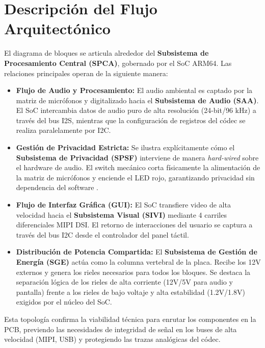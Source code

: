 \documentclass[%
	paper=a4,
	twoside=false,
	parskip=half,
	chapterprefix=false,
	10pt,
	headings=normal,
	bibliography=totoc,
	listof=totoc,
	titlepage=on,
	captions=tableabove,
	draft=false,
]{scrbook}%
\begin{document}
\section{Descripción del Flujo Arquitectónico}

El diagrama de bloques se articula alrededor del \textbf{Subsistema de Procesamiento Central (SPCA)}, gobernado por el SoC ARM64. Las relaciones principales operan de la siguiente manera:

\begin{itemize}
    \item \textbf{Flujo de Audio y Procesamiento:} El audio ambiental es captado por la matriz de micrófonos y digitalizado hacia el \textbf{Subsistema de Audio (SAA)}. El SoC intercambia datos de audio puro de alta resolución (24-bit/96 kHz) a través del bus I2S, mientras que la configuración de registros del códec se realiza paralelamente por I2C.
    \item \textbf{Gestión de Privacidad Estricta:} Se ilustra explícitamente cómo el \textbf{Subsistema de Privacidad (SPSF)} interviene de manera \textit{hard-wired} sobre el hardware de audio. El switch mecánico corta físicamente la alimentación de la matriz de micrófonos y enciende el LED rojo, garantizando privacidad sin dependencia del software \cite{guia_proyecto_final}.
    \item \textbf{Flujo de Interfaz Gráfica (GUI):} El SoC transfiere video de alta velocidad hacia el \textbf{Subsistema Visual (SIVI)} mediante 4 carriles diferenciales MIPI DSI. El retorno de interacciones del usuario se captura a través del bus I2C desde el controlador del panel táctil.
    \item \textbf{Distribución de Potencia Compartida:} El \textbf{Subsistema de Gestión de Energía (SGE)} actúa como la columna vertebral de la placa. Recibe los 12V externos y genera los rieles necesarios para todos los bloques. Se destaca la separación lógica de los rieles de alta corriente (12V/5V para audio y pantalla) frente a los rieles de bajo voltaje y alta estabilidad (1.2V/1.8V) exigidos por el núcleo del SoC.
\end{itemize}

Esta topología confirma la viabilidad técnica para enrutar los componentes en la PCB, previendo las necesidades de integridad de señal en los buses de alta velocidad (MIPI, USB) y protegiendo las trazas analógicas del códec.

\end{document}

